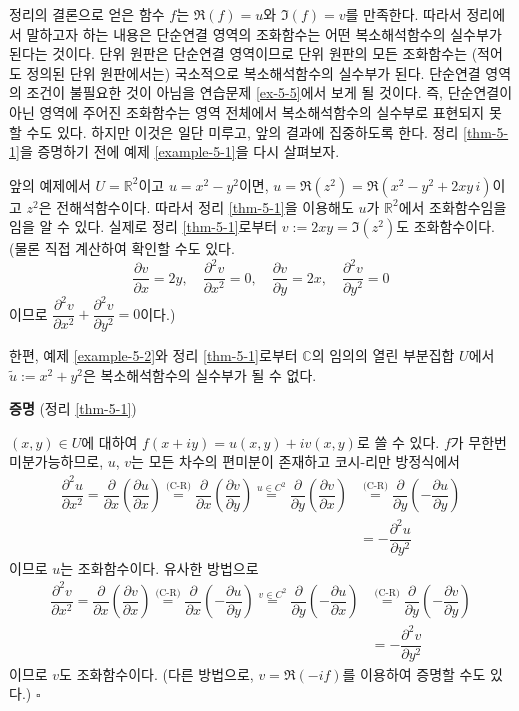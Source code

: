 정리의 결론으로 얻은 함수 $f$는 $\Re(f)=u$와 $\Im(f)=v$를 만족한다.
따라서 정리에서 말하고자 하는 내용은  단순연결 영역의 조화함수는 
어떤 복소해석함수의 실수부가 된다는 것이다.
단위 원판은 단순연결 영역이므로 단위 원판의 모든 조화함수는 (적어도 정의된 단위 원판에서는) 국소적으로
복소해석함수의 실수부가 된다.
단순연결 영역의 조건이 불필요한 것이 아님을
연습문제 \ref{ex-5-5}에서 보게 될 것이다. 즉,
단순연결이 아닌 영역에 주어진 조화함수는 영역 전체에서 복소해석함수의 실수부로 표현되지 못할 수도 있다.
하지만 이것은 일단 미루고, 앞의 결과에 집중하도록 한다. 정리 \ref{thm-5-1}을 증명하기 전에
예제 \ref{example-5-1}을 다시 살펴보자.

\begin{saltexample}[label=example-5-3]{}{}
앞의 예제에서 $U = \mathbb R^2$이고
$u = x^2-y^2$이면,
$u= \Re(z^2) = \Re(x^2-y^2 + 2xy\,i)$이고 $z^2$은 전해석함수이다.
따라서 정리 \ref{thm-5-1}을 이용해도 $u$가  $\mathbb R^2$에서 조화함수임을
임을 알 수 있다.  실제로 정리 \ref{thm-5-1}로부터 $v:=2xy = \Im(z^2)$도 조화함수이다.
(물론 직접 계산하여 확인할 수도 있다.
\[
\dfrac{\partial v}{\partial x} = 2y, \quad  \dfrac{\partial^2 v}{\partial x^2} = 0, \quad
\dfrac{\partial v}{\partial y} = 2x, \quad   \dfrac{\partial^2 v}{\partial y^2} = 0
\]
이므로 $\dfrac{\partial^2 v}{\partial x^2}+ \dfrac{\partial^2 v}{\partial y^2} = 0$이다.)

한편, 예제 \ref{example-5-2}와 정리 \ref{thm-5-1}로부터 
$\mathbb C$의 임의의 열린 부분집합 $U$에서 $\tilde u:= x^2+y^2$은 
복소해석함수의 실수부가 될 수 없다.
\end{saltexample}

{\bf 증명} (정리 \ref{thm-5-1})

$(x,y)\in U$에 대하여 $f(x+iy) = u(x,y) + iv(x,y)$로 쓸 수 있다.
$f$가 무한번 미분가능하므로, $u$, $v$는 모든 차수의 편미분이 존재하고
코시-리만 방정식에서
\begin{align*}
\dfrac{\partial^2 u}{\partial x^2} = \dfrac{\partial}{\partial x} \left( \dfrac{\partial u}{\partial x}\right)
\stackrel{\text{(C-R)}}{=} \dfrac{\partial}{\partial x} \left( \dfrac{\partial v}{\partial y}\right)
\stackrel{u\in C^2}{=} \dfrac{\partial}{\partial y} \left( \dfrac{\partial v}{\partial x}\right)
&\stackrel{\text{(C-R)}}{=} \dfrac{\partial}{\partial y} \left( - \dfrac{\partial u}{\partial y}\right) \\
&= - \dfrac{\partial^2 u}{\partial y^2}
\end{align*}
이므로 $u$는 조화함수이다. 유사한 방법으로
\begin{align*}
\dfrac{\partial^2 v}{\partial x^2} = \dfrac{\partial}{\partial x} \left( \dfrac{\partial v}{\partial x}\right)
\stackrel{\text{(C-R)}}{=} \dfrac{\partial}{\partial x} \left( - \dfrac{\partial u}{\partial y}\right)
\stackrel{v\in C^2}{=} \dfrac{\partial}{\partial y} \left( - \dfrac{\partial u}{\partial x}\right)
&\stackrel{\text{(C-R)}}{=} \dfrac{\partial}{\partial y} \left( - \dfrac{\partial v}{\partial y}\right) \\
&= - \dfrac{\partial^2 v}{\partial y^2}
\end{align*}
이므로 $v$도 조화함수이다. 
(다른 방법으로, $v= \Re(-if)$를 이용하여 증명할 수도 있다.)
\hfill $\square$

